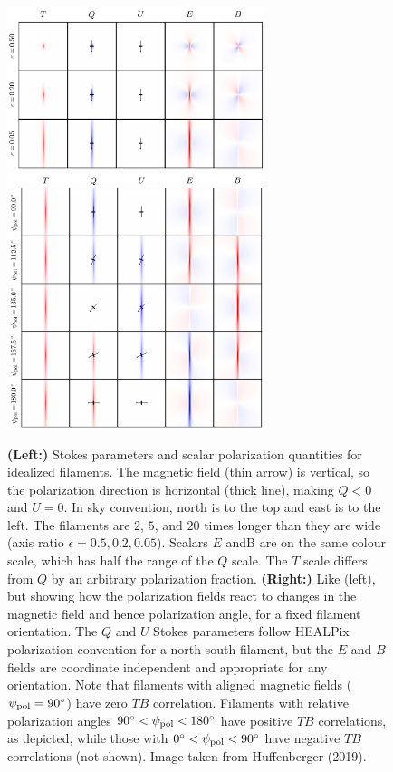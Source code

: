 \documentclass[a4paper,10pt]{article}
\begin{document}
\begin{figure}[t]
\includegraphics[width=7.5cm]{figures/TQUEB.png} \includegraphics[width=7.5cm]{figures/TQUEB_polangle.png}
\centering
\caption{\footnotesize{\textbf{(Left:)} Stokes parameters and scalar polarization quantities for idealized filaments. The magnetic field (thin arrow) is vertical, so the polarization direction is horizontal (thick line), making $Q<0$ and $U=0$. In sky convention, north is to the top and east is to the left. The filaments are $2$, $5$, and $20$ times longer than they are wide (axis ratio $\epsilon=0.5,0.2,0.05$). Scalars $E$ and$ $B are on the same colour scale, which has half the range of the $Q$ scale. The $T$ scale differs from $Q$ by an arbitrary polarization fraction. \textbf{(Right:)} Like (left), but showing how the polarization fields react to changes in the magnetic field and hence polarization angle, for a fixed filament orientation. The $Q$ and $U$ Stokes parameters follow HEALPix polarization convention for a north-south filament, but the $E$ and $B$ fields are coordinate independent and appropriate for any orientation. Note that filaments with aligned magnetic fields ($\psi_{\rm pol}=90^\circ$) have zero $TB$ correlation. Filaments with relative polarization angles $90^\circ<\psi_{\rm pol}<180^\circ$ have positive $TB$ correlations, as depicted, while those with $0^\circ<\psi_{\rm pol}<90^\circ$ have negative $TB$ correlations (not shown). Image taken from Huffenberger (2019).}}
\label{fig:tqueb}
\end{figure}
\end{document}
